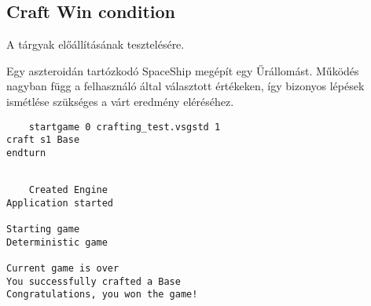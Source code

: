 \documentclass[../../projlab]{subfiles}
\begin{document}
\subsection{Craft Win condition}
\begin{test-case-description}
    A tárgyak előállításának tesztelésére.
\end{test-case-description}
\begin{test-case-function}
    Egy aszteroidán tartózkodó SpaceShip megépít egy Űrállomást. \newline
    Működés nagyban függ a felhasználó által választott értékeken, így bizonyos lépések ismétlése szükséges a várt eredmény eléréséhez.
\end{test-case-function}
\begin{test-case-input}
   
    \begin{verbatim}
    startgame 0 crafting_test.vsgstd 1
craft s1 Base
endturn
    \end{verbatim}
\end{test-case-input}
\begin{test-case-output}
\begin{verbatim}
    
    Created Engine
Application started

Starting game
Deterministic game

Current game is over
You successfully crafted a Base
Congratulations, you won the game!

    
\end{verbatim}
\end{test-case-output}
\end{document}
